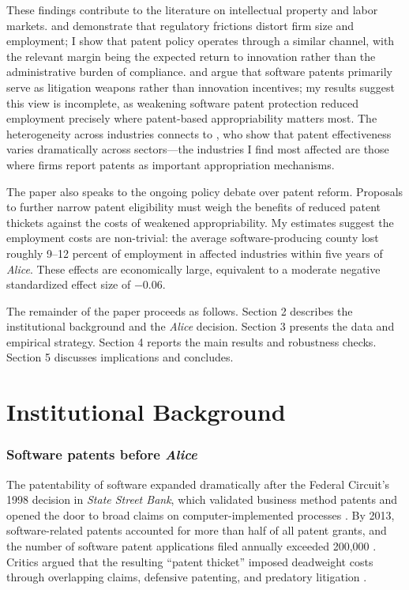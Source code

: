 \documentclass[12pt]{article}
\begin{document}
These findings contribute to the literature on intellectual property and labor markets. \citet{garicano2016firm} and \citet{bloom2019toolkit} demonstrate that regulatory frictions distort firm size and employment; I show that patent policy operates through a similar channel, with the relevant margin being the expected return to innovation rather than the administrative burden of compliance. \citet{bessen2008patent} and \citet{chien2012startups} argue that software patents primarily serve as litigation weapons rather than innovation incentives; my results suggest this view is incomplete, as weakening software patent protection reduced employment precisely where patent-based appropriability matters most. The heterogeneity across industries connects to \citet{cohen2000protecting}, who show that patent effectiveness varies dramatically across sectors---the industries I find most affected are those where firms report patents as important appropriation mechanisms.

The paper also speaks to the ongoing policy debate over patent reform. Proposals to further narrow patent eligibility \citep{burk2009patent} must weigh the benefits of reduced patent thickets against the costs of weakened appropriability. My estimates suggest the employment costs are non-trivial: the average software-producing county lost roughly 9--12 percent of employment in affected industries within five years of \textit{Alice}. These effects are economically large, equivalent to a moderate negative standardized effect size of $-$0.06.

The remainder of the paper proceeds as follows. Section 2 describes the institutional background and the \textit{Alice} decision. Section 3 presents the data and empirical strategy. Section 4 reports the main results and robustness checks. Section 5 discusses implications and concludes.


\section{Institutional Background}

\subsubsection*{Software patents before \textit{Alice}} The patentability of software expanded dramatically after the Federal Circuit's 1998 decision in \textit{State Street Bank}, which validated business method patents and opened the door to broad claims on computer-implemented processes \citep{hunt2010business}. By 2013, software-related patents accounted for more than half of all patent grants, and the number of software patent applications filed annually exceeded 200,000 \citep{bessen2014direct}. Critics argued that the resulting ``patent thicket'' imposed deadweight costs through overlapping claims, defensive patenting, and predatory litigation \citep{shapiro2001navigating, lemley2012software}.
\end{document}
